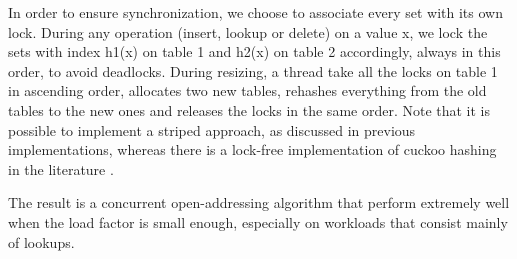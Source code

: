 In order to ensure synchronization, we choose to associate every set with its own lock. During any operation (insert, lookup or delete) on a value x, we lock the sets with index h1(x) on table 1 and h2(x) on table 2 accordingly, always in this order, to avoid deadlocks. During resizing, a thread take all the locks on table 1 in ascending order, allocates two new tables, rehashes everything from the old tables to the new ones and releases the locks in the same order. Note that it is possible to implement a striped approach, as discussed in previous implementations, whereas there is a lock-free implementation of cuckoo hashing in the literature \cite{lock_free_cuckoo}.

The result is a concurrent open-addressing algorithm that perform extremely well when the load factor is small enough, especially on workloads that consist mainly of lookups.



